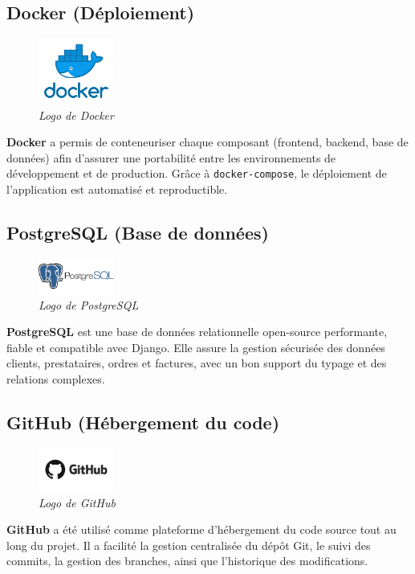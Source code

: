 \subsection*{Docker (Déploiement)}
\begin{figure}[H]
\centering
\includegraphics[width=2.5cm]{figures/docker.png}
\caption*{\textit{Logo de Docker}}
\end{figure}
\noindent
\textbf{Docker} a permis de conteneuriser chaque composant (frontend, backend, base de données) afin d’assurer une portabilité entre les environnements de développement et de production. Grâce à \texttt{docker-compose}, le déploiement de l’application est automatisé et reproductible.

\subsection*{PostgreSQL (Base de données)}
\begin{figure}[H]
\centering
\includegraphics[width=2.5cm]{figures/postgres.png}
\caption*{\textit{Logo de PostgreSQL}}
\end{figure}
\noindent
\textbf{PostgreSQL} est une base de données relationnelle open-source performante, fiable et compatible avec Django. Elle assure la gestion sécurisée des données clients, prestataires, ordres et factures, avec un bon support du typage et des relations complexes.

\subsection*{GitHub (Hébergement du code)}
\begin{figure}[H]
\centering
\includegraphics[width=2.5cm]{figures/github.png}
\caption*{\textit{Logo de GitHub}}
\end{figure}
\noindent
\textbf{GitHub} a été utilisé comme plateforme d’hébergement du code source tout au long du projet. Il a facilité la gestion centralisée du dépôt Git, le suivi des commits, la gestion des branches, ainsi que l’historique des modifications.

